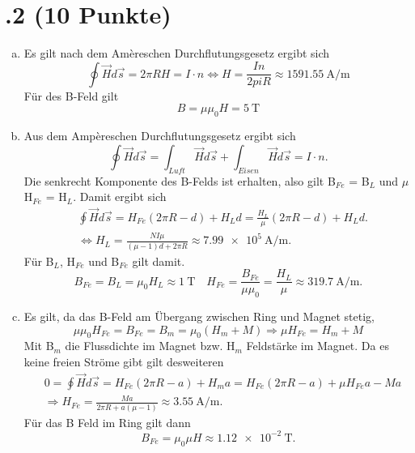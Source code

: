 \section*{\nr.2 \tittwo (10 Punkte)}
\begin{enumerate}[(a)]
\item Es gilt nach dem Amèreschen Durchflutungsgesetz ergibt sich
\begin{equation}
	\oint \vec{H} d\vec{s} = 2 \pi R H = I\cdot n \Leftrightarrow 
	H = \frac{I n}{2 pi R} \approx \SI{1591,55}{\ampere \per \meter}
\end{equation}
Für des B-Feld gilt
\begin{equation}
	B = \mu\mu_0 H = \SI{5}{\tesla}
\end{equation}
\item Aus dem Ampèreschen Durchflutungsgesetz ergibt sich
\begin{equation}
	\oint \vec{H} d\vec{s} = \int_{Luft} \vec{H} d\vec{s} + \int_{Eisen} \vec{H} 
	d\vec{s} = I\cdot n.
\end{equation}
Die senkrecht Komponente des B-Felds ist erhalten, also gilt B$_{Fe}$ = B$_L$ und $\mu$H$_{Fe}$ = H$_L$. Damit ergibt sich
\begin{align}
	&\oint \vec{H} d\vec{s} = H_{Fe}(2 \pi R - d) + H_L d = \frac{H_L}{\mu}
	(2 \pi R - d) + H_L d. \\ &\Leftrightarrow H_L = \frac{NI\mu}{(\mu - 1)d +2\pi  R} \approx \SI{7.99e5}{\ampere \per \meter}.
\end{align}
	Für B$_L$, H$_{Fe}$ und B$_{Fe}$ gilt damit.
\begin{equation}
	B_{Fe} = B_L = \mu_0 H_L \approx \SI{1}{\tesla} \quad H_{Fe} = \frac{B_{Fe}}{\mu \mu_0} = \frac{H_L}{\mu} \approx \SI{319,7}{\ampere \per \meter}.
\end{equation}
\item Es gilt, da das B-Feld am Übergang zwischen Ring und Magnet stetig,
\begin{equation}
	\mu \mu_0 H_{Fe} = B_{Fe} = B_{m} = \mu_0(H_{m} + M) 
	\Rightarrow \mu H_{Fe} = H_{m} + M
\end{equation}
Mit B$_{m}$ die Flussdichte im Magnet bzw. H$_{m}$ Feldstärke im Magnet. Da es keine freien Ströme gibt gilt desweiteren
\begin{align}
	&0 = \oint \vec{H} d\vec{s} = H_{Fe}(2  \pi R - a) + H_{m} a = H_{Fe}(2\pi R-a) +
	\mu H_{Fe} a - M a 
	\\&\Rightarrow H_{Fe} = \frac{Ma}{2 \pi R+a(\mu -1)} 
	\approx \SI{3,55}{\ampere \per \meter}.
\end{align}
Für das B Feld im Ring gilt dann
\begin{equation}
	B_{Fe} = \mu_0 \mu H \approx \SI{1,12e-2}{\tesla}.
\end{equation}
\end{enumerate}
